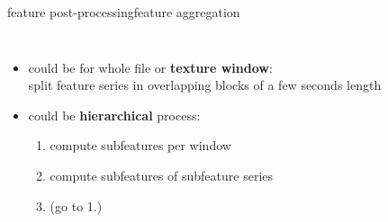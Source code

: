 		\begin{frame}{feature post-processing}{feature aggregation}
        \begin{columns}  
            \begin{itemize}
                \item       could be for whole file or \textbf{texture window}:\\ split feature series in overlapping blocks of a few seconds length
                \bigskip
                \item<2->   could be \textbf{hierarchical} process:
                    \begin{enumerate}
                        \item   compute subfeatures per window
                        \item   compute subfeatures of subfeature series
                        \item   (go to 1.)
                    \end{enumerate}
            \end{itemize}
            

\end{columns}
\end{frame}
